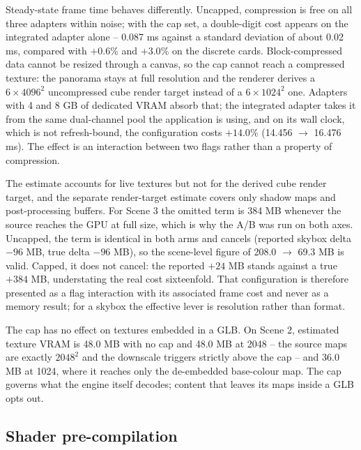 Steady-state frame time behaves differently. Uncapped, compression is free on all three adapters within noise; with the cap set, a double-digit cost appears on the integrated adapter alone -- 0.087 ms against a standard deviation of about 0.02 ms, compared with $+0.6$\% and $+3.0$\% on the discrete cards. Block-compressed data cannot be resized through a canvas, so the cap cannot reach a compressed texture: the panorama stays at full resolution and the renderer derives a $6\times4096^2$ uncompressed cube render target instead of a $6\times1024^2$ one. Adapters with 4 and 8 GB of dedicated VRAM absorb that; the integrated adapter takes it from the same dual-channel pool the application is using, and on its wall clock, which is not refresh-bound, the configuration costs $+14.0$\% (14.456 $\rightarrow$ 16.476 ms). The effect is an interaction between two flags rather than a property of compression.

The estimate accounts for live textures but not for the derived cube render target, and the separate render-target estimate covers only shadow maps and post-processing buffers. For Scene 3 the omitted term is 384 MB whenever the source reaches the GPU at full size, which is why the A/B was run on both axes. Uncapped, the term is identical in both arms and cancels (reported skybox delta $-96$ MB, true delta $-96$ MB), so the scene-level figure of 208.0 $\rightarrow$ 69.3 MB is valid. Capped, it does not cancel: the reported $+24$ MB stands against a true $+384$ MB, understating the real cost sixteenfold. That configuration is therefore presented as a flag interaction with its associated frame cost and never as a memory result; for a skybox the effective lever is resolution rather than format.

The cap has no effect on textures embedded in a GLB. On Scene 2, estimated texture VRAM is 48.0 MB with no cap and 48.0 MB at 2048 -- the source maps are exactly $2048^2$ and the downscale triggers strictly above the cap -- and 36.0 MB at 1024, where it reaches only the de-embedded base-colour map. The cap governs what the engine itself decodes; content that leaves its maps inside a GLB opts out.

\thisbottomragged
\subsection{Shader pre-compilation}
\label{sec:res-warmup}

